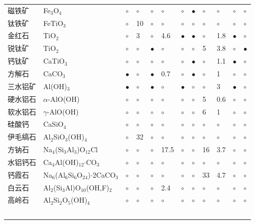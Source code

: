 \begin{table}
\begin{threeparttable}
\begin{tabular}{llllllllllll}
			磁铁矿& Fe$ _{\mathrm{3}} $O$ _{\mathrm{4}} $&$\circ$&$\circ$&$\circ$&$\circ$&$\circ$&$\bullet$&$\circ$&$\circ$&$\circ$&$\circ$\\
			钛铁矿& FeTiO$ _{\mathrm{3}} $&$\circ$&10&$\circ$&$\circ$&$\circ$&$\circ$&$\circ$&$\circ$&$\circ$&$\circ$\\
			金红石& TiO$ _{\mathrm{2}} $&$\circ$&3&$\circ$&4.6&$\bullet$&$\bullet$&$\circ$&1.8&$\bullet$&$\circ$\\
			锐钛矿&TiO$ _{\mathrm{2}} $&$\circ$&$\circ$&$\bullet$&$\circ$&$\circ$&$\circ$&5&3.8&$\circ$&$\bullet$\\
			钙钛矿& CaTiO$ _{\mathrm{3}} $&$\circ$&$\circ$&$\circ$&$\circ$&$\circ$&$\bullet$&$\circ$&1.1&$\bullet$&$\circ$\\
			方解石& CaCO$ _{\mathrm{3}} $&$\bullet$&$\circ$&$\bullet$&0.7&$\circ$&$\bullet$&$\circ$&1&$\circ$&$\circ$\\
			三水铝矿& Al(OH)$ _{\mathrm{3}} $&$\bullet$&$\circ$&$\bullet$&$\circ$&$\bullet$&$\circ$&$\circ$&3&$\bullet$&$\circ$\\
			硬水铝石& $ \alpha $-AlO(OH)&$\circ$&$\circ$&$\circ$&$\circ$&$\circ$&$\circ$&5&0.6&$\circ$&$\circ$\\
			软水铝石& $ \gamma $-AlO(OH)&$\circ$&$\circ$&$\circ$&$\circ$&$\circ$&$\circ$&6&1&$\circ$&$\circ$\\
			硅酸钙& CaSiO$ _{\mathrm{4}} $&$\circ$&$\circ$&$\circ$&$\circ$&$\circ$&$\circ$&$\circ$&$\circ$&$\circ$&$\circ$\\
			伊毛缟石& Al$ _{\mathrm{2}} $SiO$ _{\mathrm{3}} $(OH)$ _{\mathrm{4}} $&$\circ$&32&$\circ$&$\circ$&$\circ$&$\circ$&$\circ$&$\circ$&$\circ$&$\circ$\\
			方钠石& Na$ _{\mathrm{4}} $(Si$ _{\mathrm{3}} $Al$ _{\mathrm{3}} $)O$ _{\mathrm{12}} $Cl&$\circ$&$\circ$&$\circ$&17.5&$\circ$&$\circ$&16&3.7&$\circ$&$\circ$\\
			水铝钙石& Ca$ _{\mathrm{4}} $Al(OH)$ _{\mathrm{12}} $$ \cdot $CO$ _{\mathrm{3}} $&$\circ$&$\circ$&$\circ$&$\circ$&$\circ$&$\circ$&$\circ$&$\circ$&$\circ$&$\circ$\\
			钙霞石& Na$ _{\mathrm{6}} $(Al$ _{\mathrm{6}} $Si$ _{\mathrm{6}} $O$ _{\mathrm{24}} $)$ \cdot $2CaCO$ _{\mathrm{3}} $&$\circ$&$\circ$&$\circ$&$\circ$&$\circ$&$\circ$&33&4.7&$\circ$&$\circ$\\
			白云石& Al$ _{\mathrm{2}} $(Si$ _{\mathrm{3}} $Al)O$ _{\mathrm{10}} $(OH,F)$ _{\mathrm{2}} $&$\circ$&$\circ$&$\circ$&2.4&$\circ$&$\circ$&$\circ$&$\circ$&$\circ$&$\circ$\\
			高岭石& Al$ _{\mathrm{2}} $Si$ _{\mathrm{2}} $O$ _{\mathrm{5}} $(OH)$ _{\mathrm{4}} $&$\circ$&$\circ$&$\circ$&$\circ$&$\circ$&$\circ$&$\circ$&$\circ$&$\circ$&$\circ$\\
$$
\end{tabular}
\end{threeparttable}
\end{table}
